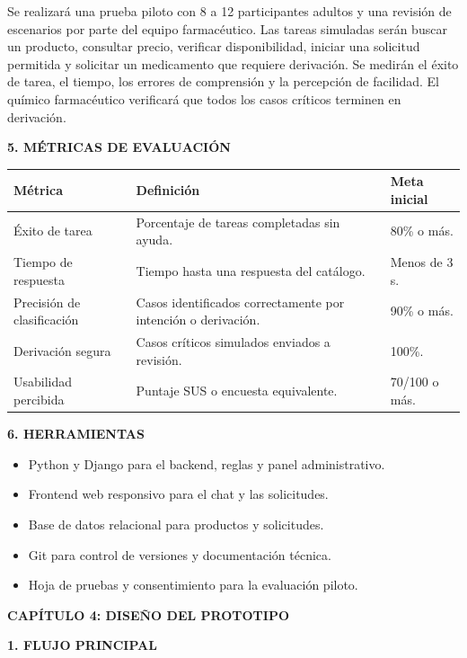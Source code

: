 \documentclass[11pt,a4paper]{article}
\newcommand{\capitulo}[1]{\vspace{1.2em}\noindent\textbf{\large #1}\par\vspace{0.45em}}
\newcommand{\apartado}[1]{\vspace{0.85em}\noindent\textbf{#1}\par\vspace{0.3em}}
\begin{document}
Se realizará una prueba piloto con 8 a 12 participantes adultos y una revisión de escenarios por parte del equipo farmacéutico. Las tareas simuladas serán buscar un producto, consultar precio, verificar disponibilidad, iniciar una solicitud permitida y solicitar un medicamento que requiere derivación. Se medirán el éxito de tarea, el tiempo, los errores de comprensión y la percepción de facilidad. El químico farmacéutico verificará que todos los casos críticos terminen en derivación.

\apartado{5. MÉTRICAS DE EVALUACIÓN}

\begin{table}[h!]
\centering
\small
\begin{tabularx}{\textwidth}{p{}Yp{0.20\textwidth}}
\toprule
\textbf{Métrica} & \textbf{Definición} & \textbf{Meta inicial} \\
\midrule
Éxito de tarea & Porcentaje de tareas completadas sin ayuda. & 80\% o más. \\
Tiempo de respuesta & Tiempo hasta una respuesta del catálogo. & Menos de 3 s. \\
Precisión de clasificación & Casos identificados correctamente por intención o derivación. & 90\% o más. \\
Derivación segura & Casos críticos simulados enviados a revisión. & 100\%. \\
Usabilidad percibida & Puntaje SUS o encuesta equivalente. & 70/100 o más. \\
\bottomrule
\end{tabularx}
\end{table}

\apartado{6. HERRAMIENTAS}

\begin{itemize}[leftmargin=1.5em,itemsep=0.3em]
    \item Python y Django para el backend, reglas y panel administrativo.
    \item Frontend web responsivo para el chat y las solicitudes.
    \item Base de datos relacional para productos y solicitudes.
    \item Git para control de versiones y documentación técnica.
    \item Hoja de pruebas y consentimiento para la evaluación piloto.
\end{itemize}

\capitulo{CAPÍTULO 4: DISEÑO DEL PROTOTIPO}

\apartado{1. FLUJO PRINCIPAL}
\end{document}
